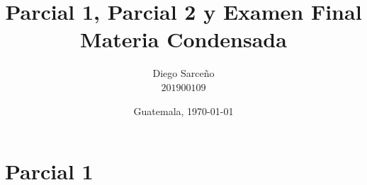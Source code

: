 





\title{\sc Parcial 1, Parcial 2 y Examen Final \\ \footnotesize{Materia Condensada}}%
\author{Diego Sarceño \\ $201900109$}
\date{Guatemala, \today}

  
\maketitle



\section*{Parcial 1}
\label{sec:parcial1}
	
